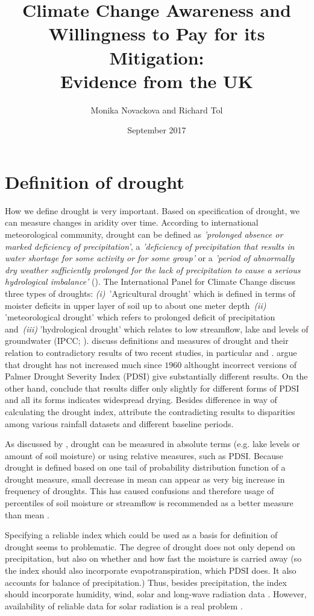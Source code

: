 \documentclass[a4paper,12pt]{article}
\date{\normalsize{September 2017}}
\title{\Large \bf Climate Change Awareness and Willingness to Pay for its Mitigation: \\ Evidence from the UK}
\author{Monika Novackova and Richard Tol}
\affil{\small{Department of Economics, University of Sussex, Falmer, UK}}
\begin{document}
\sloppy
\section*{Definition of drought}
How we define drought is very important. Based on specification of drought, we can measure changes in aridity over time. According to international meteorological community, drought can be defined as \textit{ 'prolonged absence or marked deficiency of precipitation'}, a \textit{'deficiency of precipitation that results in water shortage for some activity or for some group'} or a \textit{'period of abnormally dry weather sufficiently prolonged for the lack of precipitation to cause a serious hydrological imbalance'} (\citealp{IPCCtrenberth, Heim2002}). The International Panel for Climate Change discuss three types of droughts: \textit{(i)}~'Agricultural drought' which is defined in terms of moister deficits in upper layer of soil up to about one meter depth~\textit{(ii)} 'meteorological drought' which refers to prolonged deficit of precipitation and~\textit{(iii)} 'hydrological drought' which relates to low streamflow, lake and levels of groundwater (IPCC; \citealp{IPCCtrenberth, Heim2002}). \cite{Trenberth2014} discuss definitions and measures of drought and their relation to contradictory results of two recent studies, in particular \cite{Sheffield2012} and \cite{Dai2011}. \cite{Sheffield2012} argue that drought has not increased much since $1960$ althought incorrect versions of Palmer Drought Severity Index (PDSI) give substantially different results. On the other hand, \cite{Dai2011} conclude that results differ only slightly for different forms of PDSI and all its forms indicates widespread drying. Besides difference in way of calculating the drought index, \cite{Trenberth2014} attribute the contradicting results to disparities among various rainfall datasets and different baseline periods.   

As discussed by \cite{Trenberth2014}, drought can be measured in absolute terms (e.g. lake levels or amount of soil moisture) or using relative measures, such as PDSI. Because drought is defined based on one tail of probability distribution function of a drought measure, small decrease in mean can appear as very big increase in frequency of droughts. This has caused confusions and therefore usage of percentiles of soil moisture or streamflow is recommended as a better measure than mean \citep{Trenberth2014}.

Specifying a reliable index which could be used as a basis for definition of drought seems to problematic. The degree of drought does not only depend on precipitation, but also on whether and how fast the moisture is carried away (so the index should also incorporate evapotranspiration, which PDSI does. It also accounts for balance of precipitation.) Thus, besides precipitation, the index should incorporate humidity, wind, solar and long-wave radiation data \citep{vanderSchrier2011}.  However, availability of reliable data for solar radiation is a real problem \citep{Wang2012}.
\end{document}
